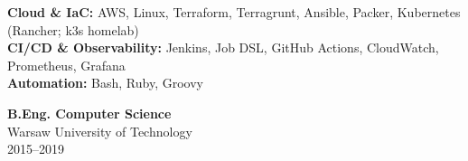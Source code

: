 \documentclass[11pt, a4paper]{awesome-cv}
\begin{document}
\makecvheader

\noindent
\begin{minipage}[t]{0.63\textwidth}
  \vspace{0pt}
  \par
  \begin{cvparagraph}
    \textbf{Cloud \& IaC:} AWS, Linux, Terraform, Terragrunt, Ansible, Packer, Kubernetes (Rancher; k3s homelab)\\
    \textbf{CI/CD \& Observability:} Jenkins, Job DSL, GitHub Actions, CloudWatch, Prometheus, Grafana\\
    \textbf{Automation:} Bash, Ruby, Groovy
  \end{cvparagraph}
\end{minipage}\hfill
\begin{minipage}[t]{0.32\textwidth}
  \vspace{0pt}
  \par
  \begin{cvparagraph}
    \textbf{B.Eng. Computer Science}\\
    Warsaw University of Technology\\
    2015--2019
  \end{cvparagraph}
\end{minipage}


\end{document}
